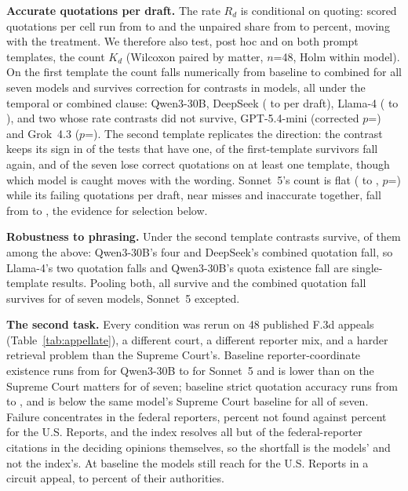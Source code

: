 \documentclass{IOS-Book-Article}
\begin{document}
\textbf{Accurate quotations per draft.} The rate $R_d$ is conditional on quoting: scored quotations per cell run from \scoredCellMin{} to \scoredCellMax{} and the unpaired share from \unpairedCellMin{} to \unpairedCellMax{} percent, moving with the treatment. We therefore also test, post hoc and on both prompt templates, the count $K_d$ (Wilcoxon paired by matter, $n$=48, Holm within model). On the first template the count falls numerically from baseline to combined for all seven models and survives correction for \countSurvivors{} contrasts in \countModelsWithFall{} models, all under the temporal or combined clause: Qwen3-30B, DeepSeek (\accPerDraftDeepseekBase{} to \accPerDraftDeepseekCombo{} per draft), Llama-4 (\accPerDraftLlamaBase{} to \accPerDraftLlamaCombo), and two whose rate contrasts did not survive, GPT-5.4-mini (corrected $p$=\countHolmGptCombo) and Grok~4.3 ($p$=\countHolmGrokCombo). The second template replicates the direction: the contrast keeps its sign in \countSignAgree{} of the \countSignN{} tests that have one, \countASurvFallB{} of the \countASurvN{} first-template survivors fall again, and \countEitherModels{} of the seven lose correct quotations on at least one template, though which model is caught moves with the wording. Sonnet~5's count is flat (\accPerDraftSonnetBase{} to \accPerDraftSonnetCombo, $p$=\countPSonnetCombo) while its failing quotations per draft, near misses and inaccurate together, fall from \inaccPerDraftSonnetBase{} to \inaccPerDraftSonnetCombo, the evidence for selection below.

\textbf{Robustness to phrasing.} Under the second template \phrSurvB{} contrasts survive, \phrAinB{} of them among the \phrSurvA{} above: Qwen3-30B's four and DeepSeek's combined quotation fall, so Llama-4's two quotation falls and Qwen3-30B's quota existence fall are single-template results. Pooling both, all \phrSurvA{} survive and the combined quotation fall survives for \phrPooledQuoteCombo{} of seven models, Sonnet~5 excepted.

\textbf{The second task.} Every condition was rerun on 48 published F.3d appeals (Table~\ref{tab:appellate}), a different court, a different reporter mix, and a harder retrieval problem than the Supreme Court's. Baseline reporter-coordinate existence runs from \aExistBaseMin{} for Qwen3-30B to \aExistSonnetBase{} for Sonnet~5 and is lower than on the Supreme Court matters for \aLowerThanScotus{} of seven; baseline strict quotation accuracy runs from \aStrictBaseMin{} to \aStrictBaseMax, and is below the same model's Supreme Court baseline for all \aLowerStrictThanScotus{} of seven. Failure concentrates in the federal reporters, \aNfFederalPct{} percent not found against \aNfUsPct{} percent for the U.S. Reports, and the index resolves all but \irFederalNf{} of the \irFederalN{} federal-reporter citations in the deciding opinions themselves, so the shortfall is the models' and not the index's. At baseline the models still reach for the U.S. Reports in a circuit appeal, \aUsShareMin{} to \aUsShareMax{} percent of their authorities.
\end{document}
